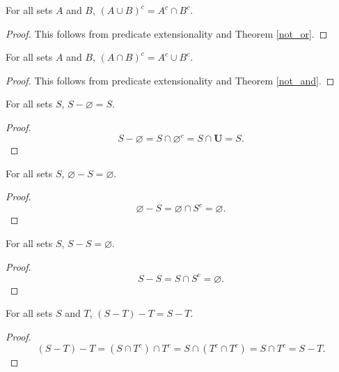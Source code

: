 \documentclass[../math.tex]{subfiles}
\begin{document}
\begin{theorem} \label{union_compl}
    For all sets $A$ and $B$, $(A \cup B)^c = A^c \cap B^c$.
\end{theorem}
\begin{proof}
    This follows from predicate extensionality and Theorem \ref{not_or}.
\end{proof}

\begin{theorem} \label{inter_compl}
    For all sets $A$ and $B$, $(A \cap B)^c = A^c \cup B^c$.
\end{theorem}
\begin{proof}
    This follows from predicate extensionality and Theorem \ref{not_and}.
\end{proof}

\begin{theorem}
    For all sets $S$, $S - \varnothing = S$.
\end{theorem}
\begin{proof}
    \[
        S - \varnothing = S \cap \varnothing^c = S \cap \bm U = S.
    \]
\end{proof}

\begin{theorem}
    For all sets $S$, $\varnothing - S = \varnothing$.
\end{theorem}
\begin{proof}
    \[
        \varnothing - S = \varnothing \cap S^c = \varnothing.
    \]
\end{proof}

\begin{theorem}
    For all sets $S$, $S - S = \varnothing$.
\end{theorem}
\begin{proof}
    \[
        S - S = S \cap S^c = \varnothing.
    \]
\end{proof}

\begin{theorem}
    For all sets $S$ and $T$, $(S - T) - T = S - T$.
\end{theorem}
\begin{proof}
    \[
        (S - T) - T = (S \cap T^c) \cap T^c = S \cap (T^c \cap T^c) = S \cap T^c
        = S - T.
    \]
\end{proof}
\end{document}
